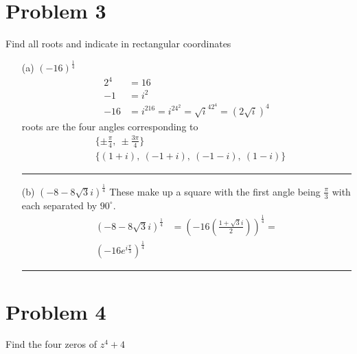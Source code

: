 \documentclass{article}
\begin{document}
\section*{Problem 3}
Find all roots and indicate in rectangular coordinates
\begin{enumerate}
\item[(a)] $(-16)^{\frac{1}{4}}$
  \begin{align*}
    2^{4} &= 16\\
    -1 &= i^2 \\
    -16 &= i^216 = i^24^2 = \sqrt{i}^42^4 = (2\sqrt{i})^4 
  \end{align*}
  roots are the four angles corresponding to
  \begin{align*}
    &\{\pm \frac{\pi}{4},\ \pm \frac{3\pi}{4}\} \\
      &\{(1+i),\ (-1+i),\ (-1-i),\ (1-i)\}
  \end{align*}
\hrule
\item[(b)] $(-8-8\sqrt{3}i)^{\frac{1}{4}}$
  These make up a square with the first angle being $\frac{\pi}{3}$ with each separated by $90^{\circ}$.
  \begin{align*}
    (-8-8\sqrt{3}i)^{\frac{1}{4}} &= \left(-16\left(\frac{1+\sqrt{3}i}{2}\right)\right)^{\frac{1}{4}} = \\
    (-16e^{i\frac{\pi}{3}})^{\frac{1}{4}}
    
  \end{align*}
\hrule
\end{enumerate}


\newpage

\section*{Problem 4}
Find the four zeros of $z^4+4$
\end{document}
